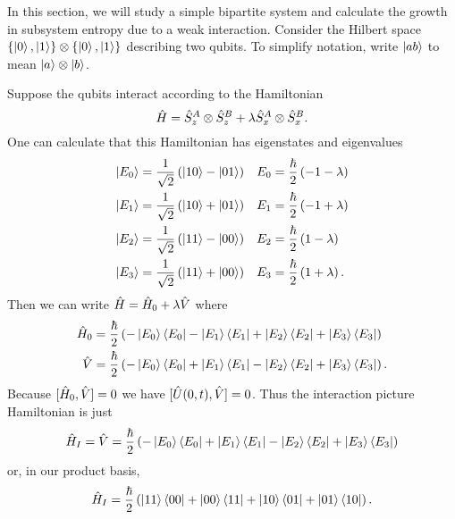 In this section, we will study a simple bipartite system and calculate the growth in subsystem entropy due to a weak interaction. Consider the Hilbert space \(\{\left|0\right\rangle, \left|1\right\rangle\}\otimes\{\left|0\right\rangle, \left|1\right\rangle\}\) describing two qubits. To simplify notation, write \(\left|ab\right\rangle\) to mean \(\left|a\right\rangle\otimes\left|b\right\rangle\).

Suppose the qubits interact according to the Hamiltonian
\[
\hat{H} = \hat{S}_z^{A}\otimes\hat{S}_z^B + \lambda \hat{S}_x^A \otimes \hat{S}_x^B.
\]
One can calculate that this Hamiltonian has eigenstates and eigenvalues
\begin{align*}
\left|E_0\right\rangle &= \frac{1}{\sqrt{2}} \left(\left|10\right\rangle-\left|01\right\rangle\right) &
E_0 &= \frac{\hbar}{2} \left(-1-\lambda\right) \\
\left|E_1\right\rangle &= \frac{1}{\sqrt{2}} \left(\left|10\right\rangle+\left|01\right\rangle\right) &
E_1 &= \frac{\hbar}{2} \left(-1+\lambda\right) \\
\left|E_2\right\rangle &= \frac{1}{\sqrt{2}} \left(\left|11\right\rangle-\left|00\right\rangle\right) &
E_2 &= \frac{\hbar}{2} \left(1-\lambda\right) \\
\left|E_3\right\rangle &= \frac{1}{\sqrt{2}} \left(\left|11\right\rangle+\left|00\right\rangle\right) &
E_3 &= \frac{\hbar}{2} \left(1+\lambda\right).
\end{align*}
Then we can write \(\hat{H} = \hat{H}_0 + \lambda \hat{V}\) where
\begin{align*}
\hat{H}_0 &= \frac{\hbar}{2} \left(-\left|E_0\right\rangle\left\langle E_0\right| - \left|E_1\right\rangle\left\langle E_1\right| + \left|E_2\right\rangle\left\langle E_2\right| + \left|E_3\right\rangle\left\langle E_3\right|\right) \\
\hat{V} &= \frac{\hbar}{2} \left(-\left|E_0\right\rangle\left\langle E_0\right| + \left|E_1\right\rangle\left\langle E_1\right| - \left|E_2\right\rangle\left\langle E_2\right| + \left|E_3\right\rangle\left\langle E_3\right|\right).
\end{align*}
Because \([\hat{H}_0, \hat{V}] = 0\) we have \([\hat{U}(0, t), \hat{V}] = 0\). Thus the interaction picture Hamiltonian is just
\[\hat{H}_I = \hat{V} = \frac{\hbar}{2} \left(-\left|E_0\right\rangle\left\langle E_0\right| + \left|E_1\right\rangle\left\langle E_1\right| - \left|E_2\right\rangle\left\langle E_2\right| + \left|E_3\right\rangle\left\langle E_3\right|\right)\]
or, in our product basis,
\[
\hat{H}_I = \frac{\hbar}{2} \left(\left|11\right\rangle\left\langle00\right| + \left|00\right\rangle\left\langle11\right| + \left|10\right\rangle\left\langle01\right| + \left|01\right\rangle\left\langle10\right|\right).
\]




